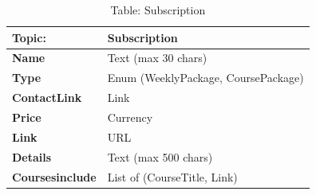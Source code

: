 \begin{table}[H]
\centering
\begin{tabularx}{\textwidth}{|>{\bfseries}l|X|}
\hline
Topic: & \textbf{Subscription} \\
\hline
Name & Text (max 30 chars) \\
\hline
Type & Enum (WeeklyPackage, CoursePackage) \\
\hline
ContactLink & Link \\
\hline
Price & Currency \\
\hline
Link & URL \\
\hline
Details & Text (max 500 chars) \\
\hline
Coursesinclude & List of (CourseTitle, Link) \\
\hline
\end{tabularx}
\caption{Table: Subscription}
\end{table}